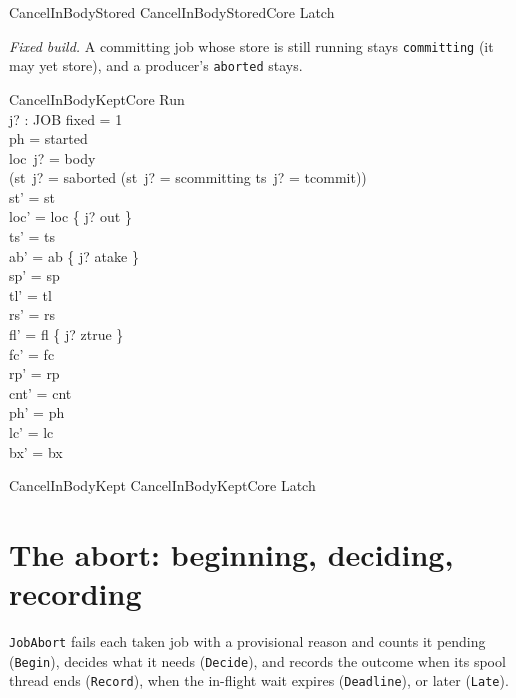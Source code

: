\documentclass[a4paper,10pt,fleqn]{article}
\newcommand{\field}[1]{\texttt{#1}}
\begin{document}
\begin{zed}
CancelInBodyStored  CancelInBodyStoredCore \land Latch
\end{zed}

\emph{Fixed build.} A committing job whose store is still running stays
\field{committing} (it may yet store), and a producer's \field{aborted} stays.

\begin{schema}{CancelInBodyKeptCore}
\Delta Run \\ j? : JOB
\where
fixed = 1 \\
ph = started \\
loc~j? = body \\
(st~j? = saborted \lor (st~j? = scommitting \land ts~j? = tcommit)) \\
st' = st \\
loc' = loc \oplus \{ j? \mapsto out \} \\
ts' = ts \\
ab' = ab \oplus \{ j? \mapsto atake \} \\
sp' = sp \\
tl' = tl \\
rs' = rs \\
fl' = fl \oplus \{ j? \mapsto ztrue \} \\
fc' = fc \\
rp' = rp \\
cnt' = cnt \\
ph' = ph \\
lc' = lc \\
bx' = bx
\end{schema}

\begin{zed}
CancelInBodyKept  CancelInBodyKeptCore \land Latch
\end{zed}


\section{The abort: beginning, deciding, recording}
\label{sec:record}

\field{JobAbort} fails each taken job with a provisional reason and counts it
pending (\field{Begin}), decides what it needs (\field{Decide}), and records the
outcome when its spool thread ends (\field{Record}), when the in-flight wait
expires (\field{Deadline}), or later (\field{Late}).
\end{document}
